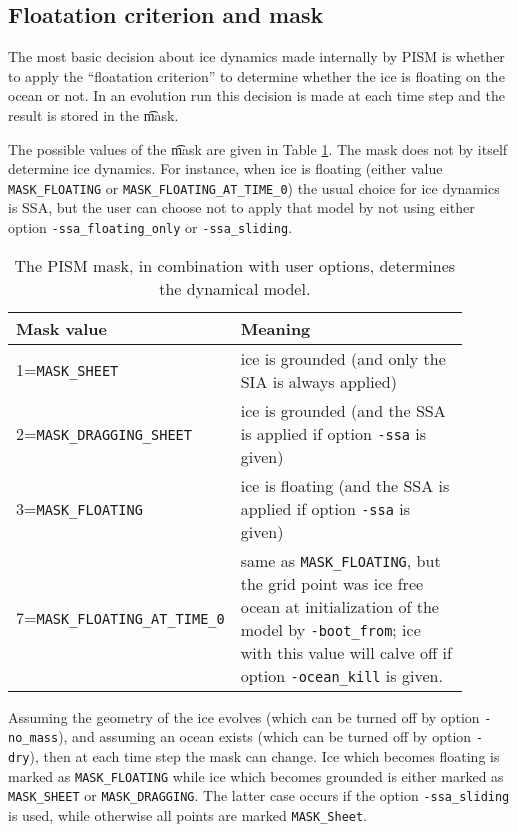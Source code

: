 \subsection{Floatation criterion and mask} \label{subsect:floatmask}  The most basic decision about ice dynamics made internally by PISM is whether to apply the ``floatation criterion'' to determine whether the ice is floating on the ocean or not.  In an evolution run this decision is made at each time step and the result is stored in the \t{mask}.

The possible values of the \t{mask} are given in Table \ref{tab:maskvals}.  The mask does not by itself determine ice dynamics.  For instance, when ice is floating (either value \texttt{MASK_FLOATING} or \texttt{MASK_FLOATING_AT_TIME_0}) the usual choice for ice dynamics is SSA, but the user can choose not to apply that model by not using either option \texttt{-ssa_floating_only} or \texttt{-ssa_sliding}.

\begin{table}[ht]
\centering
\caption{The PISM mask, in combination with user options, determines the dynamical model.}\label{tab:maskvals} 
\small
\begin{tabular}{p{0.25\linewidth}p{0.65\linewidth}}
\\\toprule
\textbf{Mask value} & \textbf{Meaning}\\\midrule
1=\texttt{MASK_SHEET} & ice is grounded (and only the SIA is always applied) \\
2=\texttt{MASK_DRAGGING_SHEET} & ice is grounded (and the SSA is applied if option \texttt{-ssa} is given) \\
3=\texttt{MASK_FLOATING} & ice is floating (and the SSA is applied if option \texttt{-ssa} is given) \\
7=\texttt{MASK_FLOATING_AT_TIME_0} & same as \texttt{MASK_FLOATING}, but the grid point was ice free ocean at initialization of the model by \texttt{-boot_from}; ice with this value will calve off if option \texttt{-ocean_kill} is given.
\\\bottomrule
\end{tabular}
\normalsize
\end{table}

Assuming the geometry of the ice evolves (which can be turned off by option \texttt{-no_mass}), and assuming an ocean exists (which can be turned off by option \texttt{-dry}), then at each time step the mask can change.  Ice which becomes floating is marked as \texttt{MASK_FLOATING} while ice which becomes grounded is either marked as \texttt{MASK_SHEET} or \texttt{MASK_DRAGGING}.  The latter case occurs if the option \texttt{-ssa_sliding} is used, while otherwise all points are marked \texttt{MASK_Sheet}.

